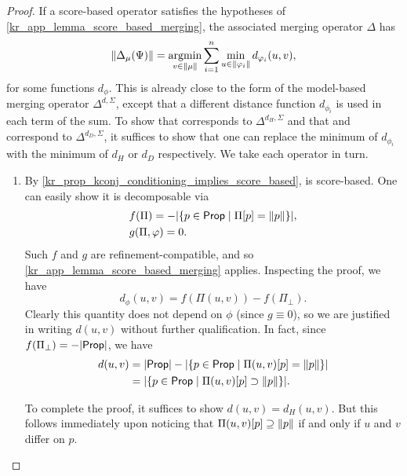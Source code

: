 \begin{proof}
    If a score-based operator satisfies the hypotheses of
    \cref{kr_app_lemma_score_based_merging}, the associated merging operator
    $\Delta$ has
    \[
        \propmods{\Delta_\mu(\Psi)}
        = \argmin_{v \in \propmods{\mu}}{
            \sum_{i=1}^{n}{
                \min_{u \in \propmods{\phi_i}}{
                    d_{\phi_i}(u, v)
                }
            }
        },
    \]
    for some functions $d_{\phi}$. This is already close to the form of the
    model-based merging operator $\Delta^{d, \Sigma}$, except that a different
    distance function $d_{\phi_i}$ is used in each term of the sum. To show
    that \varbasedcond{} corresponds to $\Delta^{d_H, \Sigma}$ and that
    \partbasedcond{} and \scorebasedop{} correspond to $\Delta^{d_D, \Sigma}$,
    it suffices to show that one can replace the minimum of $d_{\phi_i}$
    with the minimum of $d_H$ or $d_D$ respectively. We take each operator in
    turn.

    \begin{enumerate}
        \item By \cref{kr_prop_kconj_conditioning_implies_score_based},
              \varbasedcond{} is score-based. One can easily show it is
              decomposable via
              \begin{align*}
                &f(\Pi) = -|\{p \in \mathsf{Prop} \mid \Pi[p] = \|{p}\|\}|, \\
                &g(\Pi, \varphi) = 0.
              \end{align*}
              Such $f$ and $g$ are refinement-compatible, and so
              \cref{kr_app_lemma_score_based_merging} applies. Inspecting the
              proof, we have
              \[
                d_{\phi}(u, v)
                = f(\Pi(u, v)) - f(\Pi_\bot).
              \]
              Clearly this quantity does not depend on $\phi$ (since $g \equiv
              0$), so we are justified in writing $d(u, v)$ without further
              qualification. In fact, since $f(\Pi_\bot) = -|\mathsf{Prop}|$, we
              have
              \begin{align*}
                d(u, v)
                &= |\mathsf{Prop}| - |\{p \in \mathsf{Prop} \mid \Pi(u, v)[p] =
                \|{p}\|\}| \\
                &= |\{p \in \mathsf{Prop} \mid \Pi(u, v)[p] \supset \|{p}\|\}|.
              \end{align*}

              To complete the proof, it suffices to show $d(u, v) = d_H(u, v)$.
              But this follows immediately upon noticing that $\Pi(u, v)[p]
              \supseteq \|{p}\|$ if and only if $u$ and $v$ differ on $p$.


\end{enumerate}
\end{proof}
